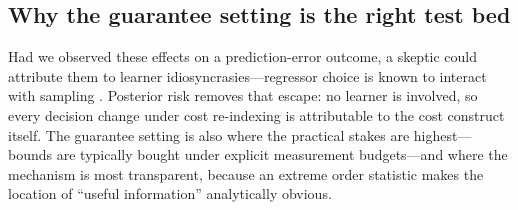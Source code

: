 \subsection{Why the guarantee setting is the right test bed}

Had we observed these effects on a prediction-error outcome, a skeptic
could attribute them to learner idiosyncrasies---regressor choice is
known to interact with sampling \citep{kaltenecker2020interplay}.
Posterior risk removes that escape: no learner is involved, so every
decision change under cost re-indexing is attributable to the cost
construct itself. The guarantee setting is also where the practical
stakes are highest---bounds are typically bought under explicit
measurement budgets---and where the mechanism is most transparent,
because an extreme order statistic makes the location of ``useful
information'' analytically obvious.
